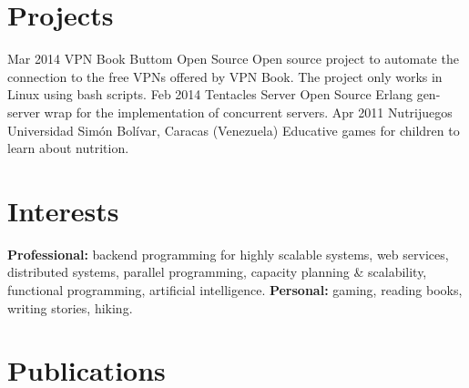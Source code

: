 \documentclass[]{friggeri-cv} %
\begin{document}

\section{Projects}

\begin{entrylist}
\entry
{Mar 2014}
{VPN Book Buttom}
{Open Source}
{Open source project to automate the connection to the free VPNs offered by VPN
Book. The project only works in Linux using bash scripts.}
\entry
{Feb 2014}
{Tentacles Server}
{Open Source}
{Erlang gen-server wrap for the implementation of concurrent servers.}
\entry
{Apr 2011}
{Nutrijuegos}
{Universidad Simón Bolívar, Caracas (Venezuela)}
{Educative games for children to learn about nutrition.}
\end{entrylist}


\section{Interests}

\textbf{Professional:} backend programming for highly scalable systems, web
services, distributed systems, parallel programming, capacity planning \&
scalability, functional programming, artificial intelligence. \textbf{Personal:}
gaming, reading books, writing stories, hiking.


\section{Publications}



\begin{refsection} %
\nocite{*}
\printbibliography[sorting=chronological, type=inproceedings, title={International peer-reviewed conferences/proceedings}, notkeyword={france}, heading=subbibliography]
\end{refsection}
\end{document}
